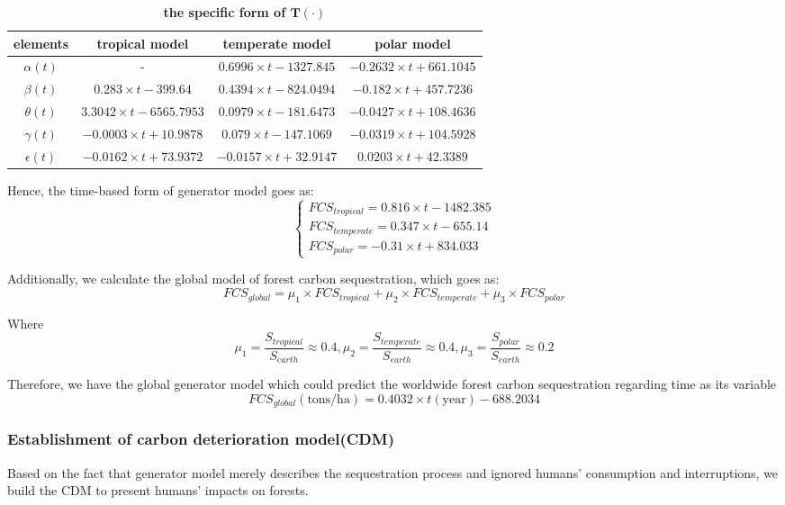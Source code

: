 \documentclass[12pt]{article}
\begin{document}
\begin{table}[h]
	\centering
	\begin{tabular}{cccc}
		\toprule[2pt]
		elements & tropical model & temperate model & polar model \\
		\midrule[1pt]
		$\alpha(t)$ & - & $0.6996\times t-1327.845$ &  $-0.2632\times t+661.1045$ \\
		$\beta(t)$ & $0.283\times t -399.64$ & $0.4394 \times t -824.0494$ & $-0.182\times t + 457.7236$ \\
		$\theta(t)$ &$3.3042\times t -6565.7953$ & $0.0979\times t -181.6473$ &$-0.0427\times t + 108.4636$ \\ 
		$\gamma(t)$ &$-0.0003\times t + 10.9878$ &$0.079\times t -147.1069$ & $-0.0319\times t + 104.5928$\\
		$\epsilon(t)$ &$-0.0162\times t + 73.9372$ &$-0.0157\times t + 32.9147$ &$0.0203\times t+42.3389$\\
		\bottomrule[2pt]
	\end{tabular}
	\label{nihe}
	\caption{\textbf{the specific form of $\textbf{T}(\cdot)$}}
\end{table}
Hence, the time-based form of generator model goes as:
\begin{equation}
	\begin{cases}
		FCS_{tropical}=0.816\times t - 1482.385 \\
		FCS_{temperate} = 0.347\times t - 655.14 \\
		FCS_{polar} = -0.31\times t + 834.033
	\end{cases}
	\label{time}
\end{equation}

Additionally, we calculate the global model of forest carbon sequestration, which goes as:
\begin{equation}
	FCS_{global} = \mu_1\times FCS_{tropical} + \mu_2 \times FCS_{temperate} + \mu_3 \times FCS_{polar}
\end{equation}

Where $$\mu_1 = \frac{S_{tropical}}{S_{earth}}\approx0.4,  \mu_2 = \frac{S_{temperate}}{S_{earth}}\approx0.4,\mu_3 = \frac{S_{polar}}{S_{earth}}\approx0.2$$

Therefore, we have the global generator model which could predict the worldwide forest carbon sequestration regarding time as its variable $$FCS_{global}(\text{tons/ha}) = 0.4032\times t(\text{year}) -688.2034$$

\subsubsection{Establishment of carbon deterioration model(CDM)}
\hspace{2em} Based on the fact that generator model merely describes the sequestration process and ignored humans' consumption and interruptions, we build the CDM to present humans' impacts on forests.
\end{document}
